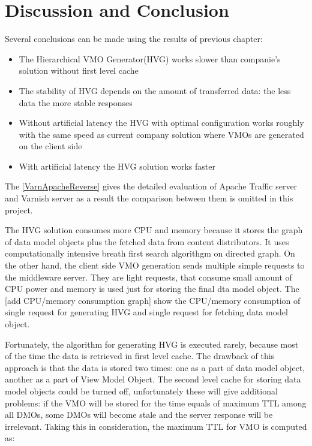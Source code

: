 \newpage
\section{Discussion and Conclusion}
	
Several conclusions can be made using the results of previous chapter: 

\begin{itemize}
	\item The Hierarchical VMO Generator(HVG) works slower than companie's solution without first level cache
	\item The stability of HVG depends on the amount of transferred data: the less data the more stable responses
	\item Without artificial latency the HVG with optimal configuration works roughly with the same speed as current company solution where VMOs are generated on the client side
	\item With artificial latency the HVG solution works faster 
\end{itemize}

The \ref{VarnApacheReverse} gives the detailed evaluation of Apache Traffic server and Varnish server as a result the comparison between them is omitted in this project. 

The HVG solution consumes more CPU and memory because it stores the graph of data model objects plus the fetched data from content distributors. It uses computationally intensive breath first search algorithgm on directed graph. On the other hand, the client side VMO generation sends multiple simple requests to the middleware server. They are light requests, that consume small amount of CPU power and memory is used just for storing the final dta model object. The [add CPU/memory consumption graph] show the CPU/memory consumption of single request for generating HVG and single request for fetching data model object.

Fortunately, the algorithm for generating HVG is executed rarely, because most of the time the data is retrieved in first level cache. The drawback of this approach is that the data is stored two times: one as a part of data model object, another as a part of View Model Object. The second level cache for storing data model objects could be turned off, unfortunately these will give additional problems: if the VMO will be stored for the time equals of maximum TTL among all DMOs, some DMOs will become stale and the server response will be irrelevant. Taking this in consideration, the maximum TTL for VMO is computed as:


